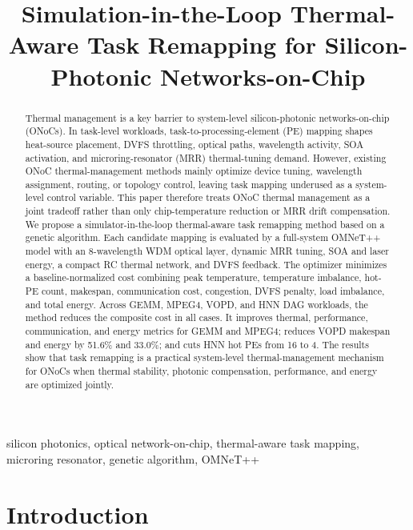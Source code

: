 \documentclass[conference]{IEEEtran}
\begin{document}
\title{Simulation-in-the-Loop Thermal-Aware Task Remapping for Silicon-Photonic Networks-on-Chip}

\author{}

\maketitle

\begin{abstract}
Thermal management is a key barrier to system-level silicon-photonic networks-on-chip (ONoCs). In task-level workloads, task-to-processing-element (PE) mapping shapes heat-source placement, DVFS throttling, optical paths, wavelength activity, SOA activation, and microring-resonator (MRR) thermal-tuning demand. However, existing ONoC thermal-management methods mainly optimize device tuning, wavelength assignment, routing, or topology control, leaving task mapping underused as a system-level control variable. This paper therefore treats ONoC thermal management as a joint tradeoff rather than only chip-temperature reduction or MRR drift compensation. We propose a simulator-in-the-loop thermal-aware task remapping method based on a genetic algorithm. Each candidate mapping is evaluated by a full-system OMNeT++ model with an 8-wavelength WDM optical layer, dynamic MRR tuning, SOA and laser energy, a compact RC thermal network, and DVFS feedback. The optimizer minimizes a baseline-normalized cost combining peak temperature, temperature imbalance, hot-PE count, makespan, communication cost, congestion, DVFS penalty, load imbalance, and total energy. Across GEMM, MPEG4, VOPD, and HNN DAG workloads, the method reduces the composite cost in all cases. It improves thermal, performance, communication, and energy metrics for GEMM and MPEG4; reduces VOPD makespan and energy by 51.6\% and 33.0\%; and cuts HNN hot PEs from 16 to 4. The results show that task remapping is a practical system-level thermal-management mechanism for ONoCs when thermal stability, photonic compensation, performance, and energy are optimized jointly.
\end{abstract}

\begin{IEEEkeywords}
silicon photonics, optical network-on-chip, thermal-aware task mapping, microring resonator, genetic algorithm, OMNeT++
\end{IEEEkeywords}

\section{Introduction}
\end{document}
